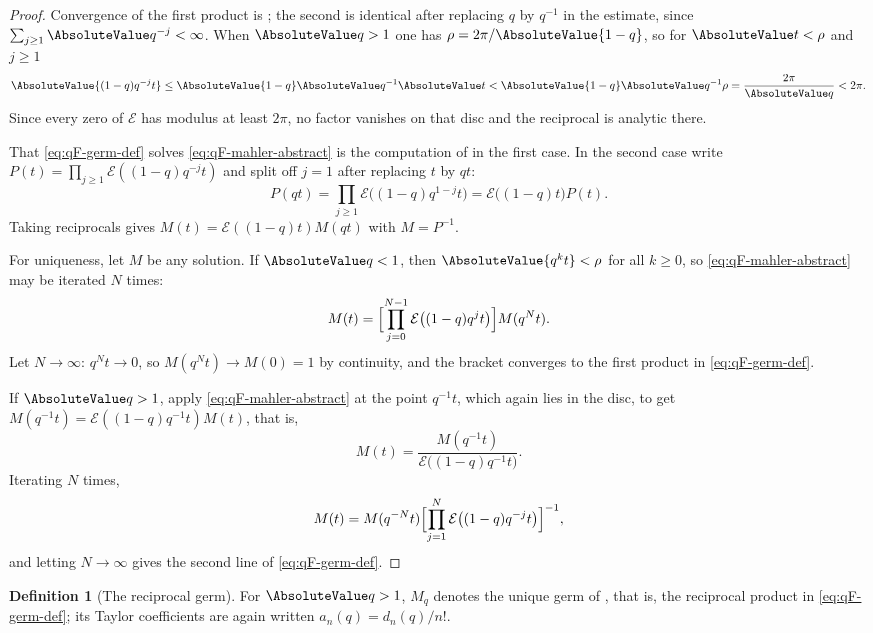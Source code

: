 \documentclass[11pt,a4paper,oneside,openany]{book}
\theoremstyle{definition}
\newtheorem{definition}[definition]{Definition}
\theoremstyle{remark}
\begin{document}
\begin{proof}
Convergence of the first product is ; the second
is identical after replacing $q$ by $q^{-1}$ in the estimate, since
$\sum_{j\ge1}\AbsoluteValue q^{-j}<\infty$.  When $\AbsoluteValue q>1$ one has
$\rho=2\pi/\AbsoluteValue{1-q}$, so for $\AbsoluteValue t<\rho$ and $j\ge1$
\[
 \AbsoluteValue{(1-q)q^{-j}t}
 \le\AbsoluteValue{1-q}\AbsoluteValue q^{-1}\AbsoluteValue t
 <\AbsoluteValue{1-q}\AbsoluteValue q^{-1}\rho
 =\frac{2\pi}{\AbsoluteValue q}<2\pi .
\]
Since every zero of $\mathcal E$ has modulus at least $2\pi$, no factor vanishes
on that disc and the reciprocal is analytic there.

That \eqref{eq:qF-germ-def} solves \eqref{eq:qF-mahler-abstract} is the
computation of  in the first case.  In the second
case write $P(t)=\prod_{j\ge1}\mathcal E((1-q)q^{-j}t)$ and split off $j=1$ after
replacing $t$ by $qt$:
\[
 P(qt)=\prod_{j\ge1}\mathcal E\bigl((1-q)q^{1-j}t\bigr)
      =\mathcal E\bigl((1-q)t\bigr)P(t).
\]
Taking reciprocals gives $M(t)=\mathcal E((1-q)t)M(qt)$ with $M=P^{-1}$.

For uniqueness, let $M$ be any solution.  If $\AbsoluteValue q<1$, then $\AbsoluteValue{q^kt}<\rho$
for all $k\ge0$, so \eqref{eq:qF-mahler-abstract} may be iterated $N$ times:
\[
 M(t)=\Bigl[\prod_{j=0}^{N-1}\mathcal E\bigl((1-q)q^{j}t\bigr)\Bigr]M(q^Nt).
\]
Let $N\to\infty$: $q^Nt\to0$, so $M(q^Nt)\to M(0)=1$ by continuity, and the
bracket converges to the first product in \eqref{eq:qF-germ-def}.

If $\AbsoluteValue q>1$, apply \eqref{eq:qF-mahler-abstract} at the point $q^{-1}t$, which
again lies in the disc, to get
$M(q^{-1}t)=\mathcal E((1-q)q^{-1}t)M(t)$, that is,
\[
 M(t)=\frac{M(q^{-1}t)}{\mathcal E\bigl((1-q)q^{-1}t\bigr)} .
\]
Iterating $N$ times,
\[
 M(t)=M(q^{-N}t)\Bigl[\prod_{j=1}^{N}\mathcal E\bigl((1-q)q^{-j}t\bigr)\Bigr]^{-1},
\]
and letting $N\to\infty$ gives the second line of \eqref{eq:qF-germ-def}.
\end{proof}

\begin{definition}[The reciprocal germ]\label{def:qF-germ}
For $\AbsoluteValue q>1$, $M_q$ denotes the unique germ of
, that is, the reciprocal product in
\eqref{eq:qF-germ-def}; its Taylor coefficients are again written
$a_n(q)=d_n(q)/n!$.
\end{definition}
\end{document}

